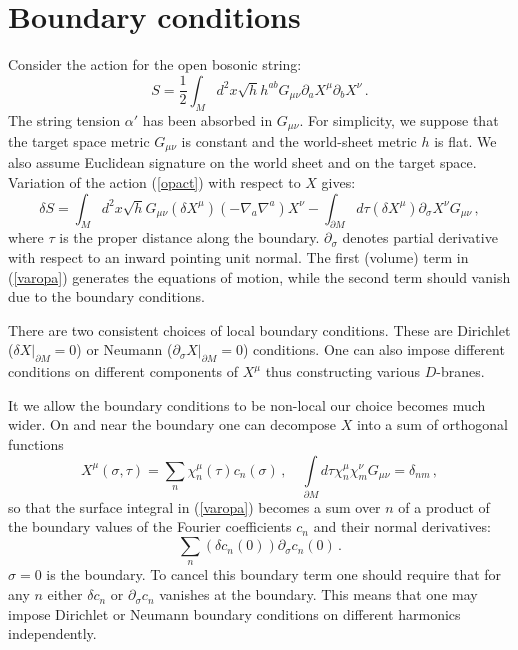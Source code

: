 \documentclass[a4paper,12pt,twoside]{article}
\begin{document}
 

\section{Boundary conditions}\label{secbc}
Consider the action for the open bosonic string:
\begin{equation}
S=\frac 12 \int_M d^2x \sqrt{h} h^{ab}G_{\mu\nu}\partial_a X^\mu
\partial_b X^\nu \,. \label{opact}
\end{equation}
The string tension $\alpha'$ has been absorbed in $G_{\mu\nu}$.
For simplicity, we suppose that the target space metric $G_{\mu\nu}$ is
constant and the world-sheet metric $h$ is flat. 
We also assume Euclidean signature on the world
sheet and on the target space. Variation of the action
(\ref{opact}) with respect to $X$ gives:
\begin{equation}
\delta S= \int_M d^2x \sqrt{h} G_{\mu\nu} (\delta X^\mu)
(-\nabla_a \nabla^a )X^\nu -\int_{\partial M} d\tau 
(\delta X^\mu )\partial_\sigma X^\nu G_{\mu\nu} \,,
\label{varopa}
\end{equation}
where $\tau$ is the proper distance along the boundary.
$\partial_\sigma$ denotes partial derivative with respect to
an inward pointing unit normal. The first (volume) term in
(\ref{varopa}) generates the equations of motion, while
the second term should vanish due to the boundary conditions.

There are two consistent choices of local boundary conditions.
These are Dirichlet ($\delta X|_{\partial M}=0$) or
Neumann ($\partial_\sigma X|_{\partial M}=0$) conditions.
One can also impose different conditions on different components
of $X^\mu$ thus constructing various $D$-branes.

It we allow the boundary conditions to be non-local our choice becomes
much wider. On and near the boundary one can decompose $X$
into a sum of orthogonal functions
\begin{equation}
X^\mu (\sigma ,\tau) =\sum\limits_n \chi^\mu_n (\tau ) c_n(\sigma )\,,
\quad
\int\limits_{\partial M} d\tau \chi^\mu_n \chi^\nu_m G_{\mu\nu} =\delta_{nm}
\,,\label{ortsum}
\end{equation}
so that the surface integral in (\ref{varopa}) becomes a sum over
$n$ of a product of the boundary values of the Fourier coefficients $c_n$
and their normal derivatives:
\begin{equation}
\sum\limits_n (\delta c_n(0)) \partial_\sigma c_n (0)\,.
\label{bsum}
\end{equation}
$\sigma =0$ is the boundary.
To cancel this boundary term one should require that 
for any $n$ either $\delta c_n$ or $\partial_\sigma c_n $
vanishes at the boundary. This means that one may impose Dirichlet
or Neumann boundary conditions on different harmonics independently.
\end{document}
